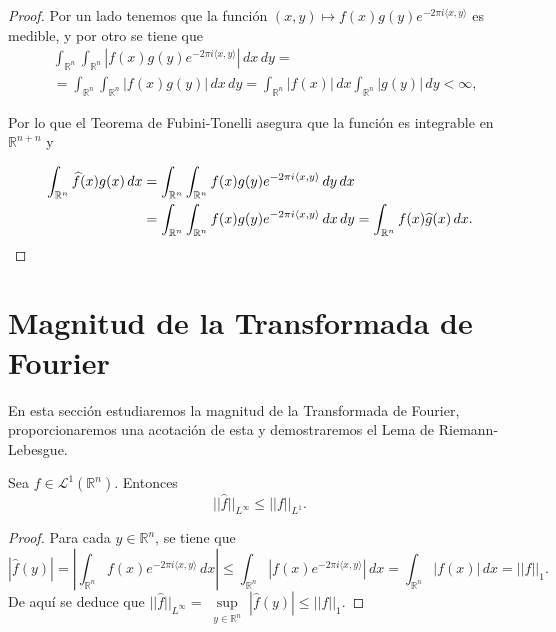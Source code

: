 \begin{proof}
Por un lado tenemos que la función $(x,y) \mapsto f(x)g(y)e^{-2 \pi i \langle x, y \rangle}$ es medible, y por otro se tiene que 
\begin{equation}
\begin{aligned}
    &\int_{\mathbb{R}^n}\int_{\mathbb{R}^n}|f(x)g(y)e^{-2 \pi i \langle x, y \rangle}| \,dx \, dy = \\
    &= \int_{\mathbb{R}^n}\int_{\mathbb{R}^n}|f(x)g(y)| \,dx \, dy = \int_{\mathbb{R}^n}|f(x)| \,dx \int_{\mathbb{R}^n}|g(y)| \, dy < \infty,
\end{aligned}
\end{equation}


\noindent Por lo que el Teorema de Fubini-Tonelli asegura que la función es integrable en $\mathbb{R}^{n+n}$ y

\begin{equation}
\begin{aligned}
    \int_{\mathbb{R}^n} \widehat{f}(x)g(x) \, dx &= \int_{\mathbb{R}^n}\int_{\mathbb{R}^n}f(x)g(y)e^{-2 \pi i \langle x, y \rangle} \,dy \,dx  \\
    &= \int_{\mathbb{R}^n}\int_{\mathbb{R}^n}f(x)g(y)e^{-2 \pi i \langle x, y \rangle} \,dx \,dy = \int_{\mathbb{R}^n} f(x) \widehat{g}(x) \, dx. \qedhere
\end{aligned}
\end{equation}
\end{proof}

\section{Magnitud de la Transformada de Fourier}
En esta sección estudiaremos la magnitud de la Transformada de Fourier, proporcionaremos una acotación de esta y demostraremos el Lema de Riemann-Lebesgue.


\begin{teorema}\label{2.2}
    Sea  $f \in \mathscr{L}^1(\mathbb{R}^n)$. Entonces
    \begin{equation}
        || \widehat{f}||_{L^{\infty}} \leq ||f||_{L^{1}}.
    \end{equation}    
\end{teorema}

\begin{proof}
    Para cada $y \in \mathbb{R}^n$, se tiene que
    \begin{equation}
     |\widehat{f}(y)| = \left| \int_{\mathbb{R}^n} f(x) e^{-2\pi i \langle x, y \rangle} \, dx \right| \leq  \int_{\mathbb{R}^n} |f(x) e^{-2\pi i \langle x, y \rangle}| \, dx  =\int_{\mathbb{R}^n} |f(x)| \, dx = ||f||_{1}.
    \end{equation}  
    De aquí se deduce que 
    $      || \widehat{f}||_{L^{\infty}} = \underset{\substack{y \in \mathbb{R}^n}}{\sup}|\widehat{f}(y)| \leq||f||_{1}$.
\end{proof}





